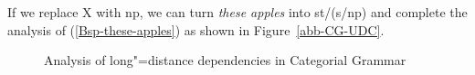If we replace X with np, we can turn \emph{these apples} into st/(s/np) and complete the analysis of 
(\ref{Bsp-these-apples}) as shown in Figure~\vref{abb-CG-UDC}.
\begin{figure}
\centerline{%
}
\caption{\label{abb-CG-UDC}Analysis of long"=distance dependencies in Categorial Grammar}
\end{figure}%

